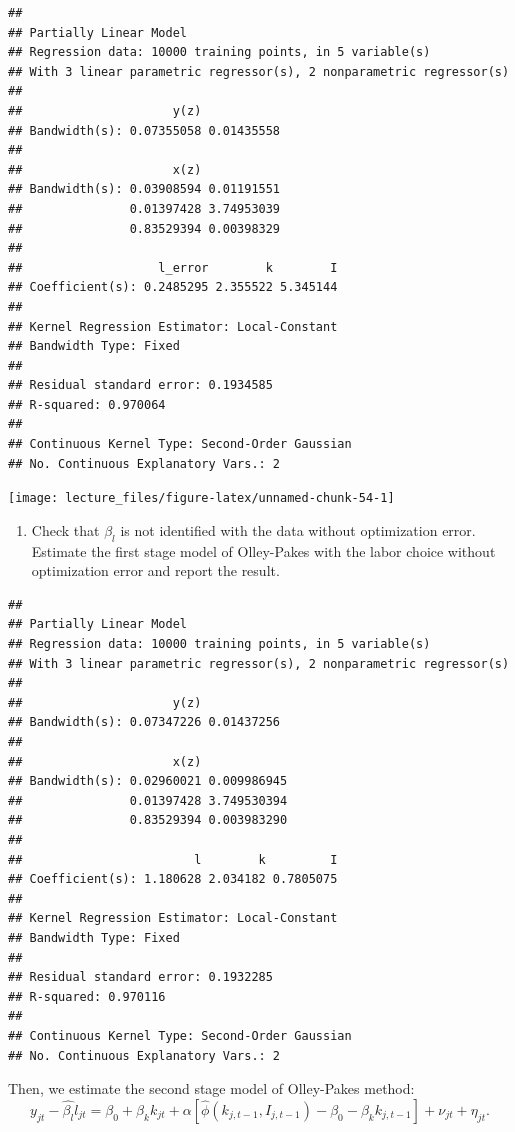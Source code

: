 \documentclass[
]{book}
\providecommand{\tightlist}{%
  \setlength{\itemsep}{0pt}\setlength{\parskip}{0pt}}
\begin{document}
\begin{verbatim}
## 
## Partially Linear Model
## Regression data: 10000 training points, in 5 variable(s)
## With 3 linear parametric regressor(s), 2 nonparametric regressor(s)
## 
##                     y(z)           
## Bandwidth(s): 0.07355058 0.01435558
## 
##                     x(z)           
## Bandwidth(s): 0.03908594 0.01191551
##               0.01397428 3.74953039
##               0.83529394 0.00398329
## 
##                   l_error        k        I
## Coefficient(s): 0.2485295 2.355522 5.345144
## 
## Kernel Regression Estimator: Local-Constant
## Bandwidth Type: Fixed
## 
## Residual standard error: 0.1934585
## R-squared: 0.970064
## 
## Continuous Kernel Type: Second-Order Gaussian
## No. Continuous Explanatory Vars.: 2
\end{verbatim}

\begin{center}\texttt{[image: lecture\_files/figure-latex/unnamed-chunk-54-1]} \end{center}

\begin{enumerate}
\def\labelenumi{\arabic{enumi}.}
\setcounter{enumi}{3}
\tightlist
\item
  Check that \(\beta_l\) is not identified with the data without optimization error. Estimate the first stage model of Olley-Pakes with the labor choice without optimization error and report the result.
\end{enumerate}

\begin{verbatim}
## 
## Partially Linear Model
## Regression data: 10000 training points, in 5 variable(s)
## With 3 linear parametric regressor(s), 2 nonparametric regressor(s)
## 
##                     y(z)           
## Bandwidth(s): 0.07347226 0.01437256
## 
##                     x(z)            
## Bandwidth(s): 0.02960021 0.009986945
##               0.01397428 3.749530394
##               0.83529394 0.003983290
## 
##                        l        k         I
## Coefficient(s): 1.180628 2.034182 0.7805075
## 
## Kernel Regression Estimator: Local-Constant
## Bandwidth Type: Fixed
## 
## Residual standard error: 0.1932285
## R-squared: 0.970116
## 
## Continuous Kernel Type: Second-Order Gaussian
## No. Continuous Explanatory Vars.: 2
\end{verbatim}

Then, we estimate the second stage model of Olley-Pakes method:
\[
y_{jt} - \hat{\beta_l} l_{jt} = \beta_0 + \beta_k k_{jt} + \alpha[\hat{\phi}(k_{j, t - 1}, I_{j, t - 1}) - \beta_0 - \beta_k k_{j, t-1}] + \nu_{jt} + \eta_{jt}.
\]
\end{document}

